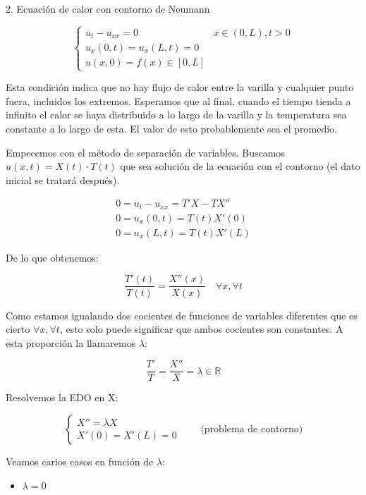 	\begin{example}{2. Ecuación de calor con contorno de Neumann}

		\[
		\begin{cases}
		u_t - u_{xx} = 0 & x \in (0,L), t > 0 \\
		u_x(0,t) = u_x(L,t) = 0 \\
		u(x,0) = f(x) \in [0,L]
		\end{cases}
		\]

		Esta condición indica que no hay flujo de calor entre la varilla y cualquier punto fuera, incluidos los extremos. Esperamos que al final, cuando el tiempo tienda a infinito el calor se haya distribuido a lo largo de la varilla y la temperatura sea constante a lo largo de esta. El valor de esto probablemente sea el promedio.

		Empecemos con el método de separación de variables. Buscamos $u(x,t) = X(t) \cdot T(t)$ que sea solución de la ecuación con el contorno (el dato inicial se tratará después).


		\[
		\begin{array}{l}
			0 = u_t - u_{xx} = T' X - T X'' \\
			0 = u_x (0,t) = T(t) X'(0) \\
			0 = u_x (L,t) = T(t) X'(L)
		\end{array}
		\]

		De lo que obtenemos:

		\[ \frac{T'(t)}{T(t)} = \frac{X''(x)}{X(x)} \quad \forall x, \forall t \]

		Como estamos igualando dos cocientes de funciones de variables diferentes que es cierto $\forall x, \forall t$, esto solo puede significar que ambos cocientes son constantes. A esta proporción la llamaremos $\lambda$:

		\[ \frac{T'}{T} = \frac{X''}{X} = \lambda \in \mathbb{R} \]

		Resolvemos la EDO en X:

		\[
		\left\{ \begin{array}{l}
		X'' = \lambda X \\
		X'(0) = X'(L) = 0
		\end{array} \right. \quad\quad \text{(problema de contorno)}
		\]

		Veamos carios casos en función de $\lambda$:

		\begin{itemize}
			\item $\lambda = 0$


\end{itemize}
\end{example}
